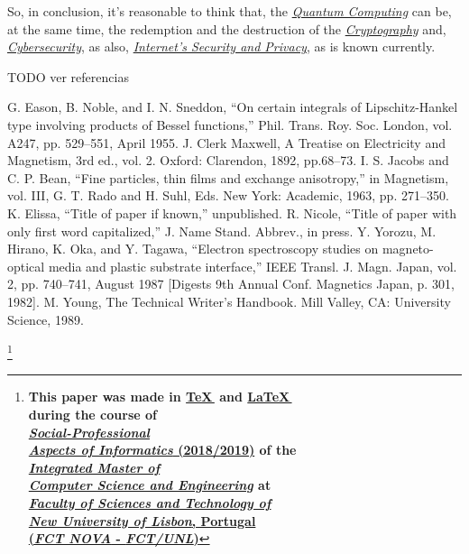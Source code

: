 \documentclass[conference]{IEEEtran}
\begin{document}
So, in conclusion, it's reasonable to think that, the \href{https://en.wikipedia.org/wiki/Quantum_computing}{\textit{Quantum Computing}} can be, at the same time, the redemption and the destruction of the \href{https://en.wikipedia.org/wiki/Cryptography}{\textit{Cryptography}}  and, \href{https://en.wikipedia.org/wiki/Computer_security}{\textit{Cybersecurity}}, as also, \href{https://en.wikipedia.org/wiki/Computer_security}{\textit{Internet's Security and Privacy}}, as is known currently.

\vspace{6pt}

TODO ver referencias

\begin{thebibliography}{00}
 G. Eason, B. Noble, and I. N. Sneddon, ``On certain integrals of Lipschitz-Hankel type involving products of Bessel functions,'' Phil. Trans. Roy. Soc. London, vol. A247, pp. 529--551, April 1955.
 J. Clerk Maxwell, A Treatise on Electricity and Magnetism, 3rd ed., vol. 2. Oxford: Clarendon, 1892, pp.68--73.
 I. S. Jacobs and C. P. Bean, ``Fine particles, thin films and exchange anisotropy,'' in Magnetism, vol. III, G. T. Rado and H. Suhl, Eds. New York: Academic, 1963, pp. 271--350.
 K. Elissa, ``Title of paper if known,'' unpublished.
 R. Nicole, ``Title of paper with only first word capitalized,'' J. Name Stand. Abbrev., in press.
 Y. Yorozu, M. Hirano, K. Oka, and Y. Tagawa, ``Electron spectroscopy studies on magneto-optical media and plastic substrate interface,'' IEEE Transl. J. Magn. Japan, vol. 2, pp. 740--741, August 1987 [Digests 9th Annual Conf. Magnetics Japan, p. 301, 1982].
 M. Young, The Technical Writer's Handbook. Mill Valley, CA: University Science, 1989.
\end{thebibliography}

\vspace{10pt}

\begin{center}
    \thanks{
        \small{
            \textbf{This paper was made in \href{http://tug.org/}{\TeX\,} and \href{https://www.latex-project.org/}{\LaTeX\,} \\
            during the course of\\
            \href{https://sites.google.com/campus.fct.unl.pt/aspi-2019}{\textit{Social-Professional\\Aspects of Informatics} (2018/2019)} of the\\
            \href{https://www.fct.unl.pt/en/education/course/integrated-master-computer-science}{\textit{Integrated Master of}\\
            \textit{Computer Science and Engineering}} at\\
            \href{https://www.fct.unl.pt/}{\textit{Faculty of Sciences and Technology of}\\
            \textit{New University of Lisbon}, Portugal\\
            (\textit{FCT NOVA} - \textit{FCT/UNL})}}}
        }
\end{center}
\end{document}
